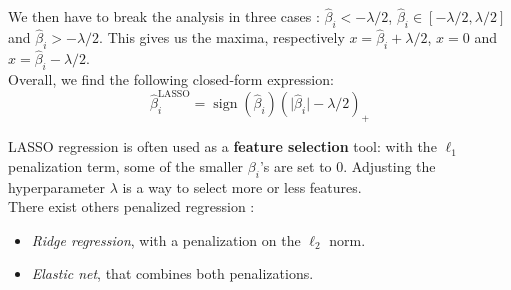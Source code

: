 We then have to break the analysis in three cases : $\hat{\beta}_i < -\lambda/2$, $ \hat{\beta}_i \in [-\lambda/2, \lambda/2]$ and $\hat{\beta}_i > -\lambda/2$. This gives us the maxima, respectively $x = \hat{\beta}_i + \lambda/2$, $x=0$ and $x = \hat{\beta}_i - \lambda/2$.\\
Overall, we find the following closed-form expression: $$\hat{\beta}_i^{\text{LASSO}} = \operatorname{sign}(\hat{\beta}_i)(\lvert \hat{\beta}_i \rvert - \lambda/2)_{+}$$

LASSO regression is often used as a \textbf{feature selection} tool: with the $\ell_1$ penalization term, some of the smaller $\beta_i$'s are set to 0. Adjusting the hyperparameter $\lambda$ is a way to select more or less features.\\

\noindent There exist others penalized regression :
\begin{itemize}
    \item \textit{Ridge regression}, with a penalization on the $\ell_2$ norm.
    \item \textit{Elastic net}, that combines both penalizations.
\end{itemize}
